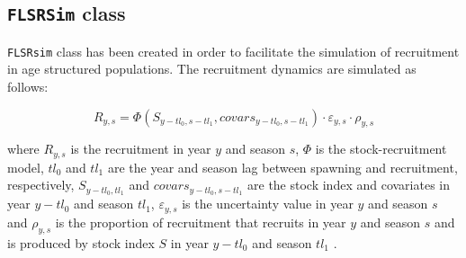 \subsection{\texttt{FLSRSim} class}

\texttt{FLSRsim} class has been created in order to facilitate the simulation of recruitment in age structured 
	 populations. The recruitment dynamics are simulated as follows:  
 
 \begin{equation}\label{eq:SRR}
    R_{y,s} = \Phi(S_{y-tl_0,s-tl_1},covars_{y-tl_0,s-tl_1})\cdot \varepsilon_{y,s} \cdot \rho_{y,s}
 \end{equation}
 
 \noindent where $R_{y,s}$ is the recruitment in year $y$ and season $s$, $\Phi$ is the stock-recruitment model, 
 $tl_0$ and $tl_1$ are the year and season lag between spawning and recruitment, respectively, $S_{y-tl_0,tl_1}$ and
 $covars_{y-tl_0,s-tl_1}$ are the stock index and covariates in year $y-tl_0$ and season $tl_1$,
 $\varepsilon_{y,s}$ is the uncertainty value in year $y$ and season $s$ and $\rho_{y,s}$ is the 
 proportion of recruitment that recruits in year $y$ and season $s$ and is produced
 by stock index $S$ in year $y-tl_0$ and season $tl_1$ .

